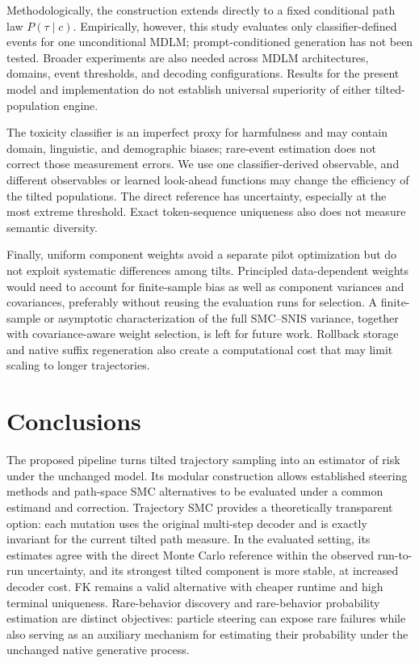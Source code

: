 \documentclass{article}
\begin{document}
Methodologically, the construction extends directly to a fixed conditional
path law $P(\tau\mid c)$. Empirically, however, this study evaluates only
classifier-defined events for one unconditional MDLM; prompt-conditioned
generation has not been tested. Broader experiments are also needed across
MDLM architectures, domains, event thresholds, and decoding configurations.
Results for the present model and implementation do not establish universal
superiority of either tilted-population engine.

The toxicity classifier is an imperfect proxy for harmfulness and may contain
domain, linguistic, and demographic biases; rare-event estimation does not
correct those measurement errors. We use one classifier-derived observable,
and different observables or learned look-ahead functions may change the
efficiency of the tilted populations. The direct reference has
uncertainty, especially at the most extreme threshold. Exact token-sequence uniqueness also does not measure semantic
diversity.

Finally, uniform component weights avoid a separate pilot optimization but do
not exploit systematic differences among tilts. Principled data-dependent
weights would need to account for finite-sample bias as well as component
variances and covariances, preferably without reusing the evaluation runs for
selection. A finite-sample or asymptotic characterization of the full
SMC--SNIS variance, together with covariance-aware weight selection, is left
for future work. Rollback storage and native suffix regeneration also create a
computational cost that may limit scaling to longer trajectories.
\section{Conclusions}

The proposed pipeline turns tilted trajectory sampling
into an estimator of risk under the unchanged model. Its modular construction
allows established steering methods and path-space SMC alternatives to be
evaluated under a common estimand and correction. Trajectory SMC provides a
theoretically transparent option: each
mutation uses the original multi-step decoder and is exactly invariant for the
current tilted path measure. In the evaluated setting, its estimates agree
with the direct Monte Carlo reference within the observed run-to-run
uncertainty, and its strongest tilted component is more stable, at increased
decoder cost. FK remains a valid alternative with cheaper runtime and high
terminal uniqueness. Rare-behavior discovery and rare-behavior probability
estimation are distinct objectives: particle steering can expose rare failures
while also serving as an auxiliary mechanism for estimating their probability
under the unchanged native generative process.
\end{document}
